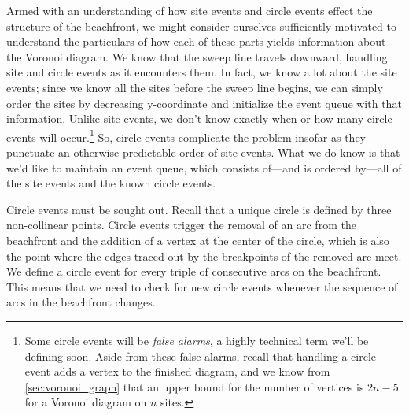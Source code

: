 \documentclass[12pt,twoside]{reedthesis}
\begin{document}
      Armed with an understanding of how site events and circle events effect the structure of the beachfront, we might consider ourselves sufficiently motivated to understand the particulars of how each of these parts yields information about the Voronoi diagram. We know that the sweep line travels downward, handling site and circle events as it encounters them. In fact, we know a lot about the site events; since we know all the sites before the sweep line begins, we can simply order the sites by decreasing y-coordinate and initialize the event queue with that information. Unlike site events, we don't know exactly when or how many circle events will occur.\footnote{Some circle events will be \emph{false alarms}, a highly technical term we'll be defining soon. Aside from these false alarms, recall that handling a circle event adds a vertex to the finished diagram, and we know from \cref{sec:voronoi_graph} that an upper bound for the number of vertices is $2n-5$ for a Voronoi diagram on $n$ sites.} So, circle events complicate the problem insofar as they punctuate an otherwise predictable order of site events. What we do know is that we'd like to maintain an event queue, which consists of---and is ordered by---all of the site events and the known circle events. \par

      Circle events must be sought out. Recall that a unique circle is defined by three non-collinear points. Circle events trigger the removal of an arc from the beachfront and the addition of a vertex at the center of the circle, which is also the point where the edges traced out by the breakpoints of the removed arc meet. We define a circle event for every triple of consecutive arcs on the beachfront. This means that we need to check for new circle events whenever the sequence of arcs in the beachfront changes.\par
\end{document}
